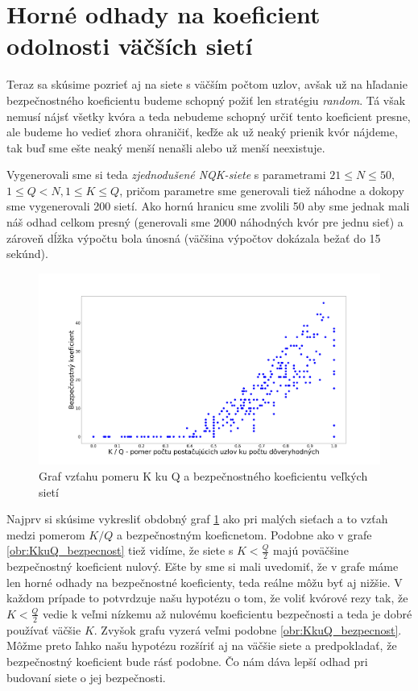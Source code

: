 \section {Horné odhady na koeficient odolnosti väčších sietí}

Teraz sa skúsime pozrieť aj na siete s väčším počtom uzlov, avšak už
na hľadanie bezpečnostného koeficientu budeme schopný požiť len stratégiu
\textit{random}. Tá však nemusí nájsť všetky kvóra a teda nebudeme schopný
určiť tento koeficient presne, ale budeme ho vedieť zhora ohraničiť,
keďže ak už neaký prienik kvór nájdeme, tak buď sme ešte neaký menší nenašli
alebo už menší neexistuje.

Vygenerovali sme si teda \textit{zjednodušené NQK-siete} s parametrami
$21\leq N\leq 50,$\\
$1\leq Q < N, 1\leq K\leq Q$, pričom parametre sme generovali tiež náhodne
a dokopy sme vygenerovali 200 sietí.
Ako hornú hranicu sme zvolili 50 aby sme jednak mali náš odhad celkom presný
(generovali sme 2000 náhodných kvór pre jednu sieť) a zároveň
dĺžka výpočtu bola únosná (väčšina výpočtov dokázala bežať do 15 sekúnd).

\begin{figure}
\centerline{\includegraphics[width=1.2\textwidth]{images/KkuQ_prienik_large.png}}
\caption{Graf vzťahu pomeru K ku Q a bezpečnostného koeficientu veľkých sietí} \label{obr:KkuQ_bezpecnost_large}
\end{figure}

Najprv si skúsime vykresliť obdobný graf \ref{obr:KkuQ_bezpecnost_large} ako
pri malých sieťach a to vzťah medzi pomerom $K/Q$ a bezpečnostným koeficnetom.
Podobne ako v grafe \ref{obr:KkuQ_bezpecnost} tiež vidíme, že siete s
$K<\frac{Q}{2}$ majú poväčšine bezpečnostný koeficient nulový. Ešte by sme si
mali uvedomiť, že v grafe máme len horné odhady na bezpečnostné koeficienty,
teda reálne môžu byť aj nižšie. V každom prípade to potvrdzuje našu hypotézu
o tom, že voliť kvórové rezy tak, že $K<\frac{Q}{2}$ vedie k veľmi nízkemu
až nulovému koeficientu bezpečnosti a teda je dobré používať väčšie $K$.
Zvyšok grafu vyzerá veľmi podobne \ref{obr:KkuQ_bezpecnost}.
Môžme preto ľahko našu hypotézu rozšíriť aj na väčšie siete a predpokladať,
že bezpečnostný koeficient bude rásť podobne.
Čo nám dáva lepší odhad pri budovaní siete o jej bezpečnosti.

